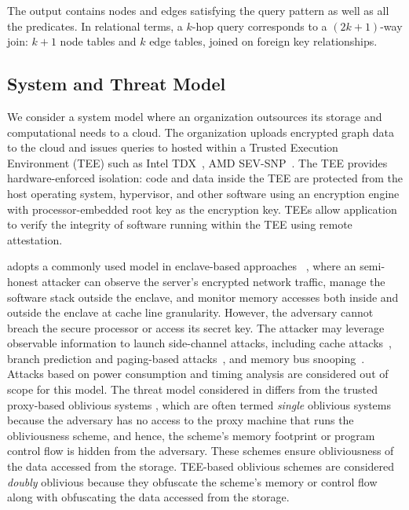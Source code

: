 The output contains nodes and edges satisfying the query pattern as well as all the predicates. 
In relational terms, a $k$-hop query corresponds to a $(2k+1)$-way join: $k+1$ node tables and $k$ edge tables, joined on foreign key relationships. 

\subsection{System and Threat Model}
\label{sec:background:threat}
We consider a system model where an organization outsources its storage and computational needs to a 
cloud. The organization uploads encrypted graph data to the cloud and issues queries to \system hosted
within a Trusted Execution Environment (TEE) such as Intel TDX~\cite{intel_tdx}, AMD SEV-SNP~\cite{sev2020strengthening}. The TEE provides hardware-enforced isolation: code and data 
inside the TEE are protected from the host operating system, hypervisor, and other software
using an encryption engine with processor-embedded root key as the encryption key. 
TEEs allow application to verify the integrity of software running within the TEE using remote 
attestation.


\system adopts a commonly used model in enclave-based approaches
~\cite{dauterman2021snoopy, krastnikov2020efficient, mishra2018oblix, chamani2023graphos, mavrogiannakis2025obliviator}, where an semi-honest attacker can observe the 
server's encrypted network traffic, manage the software stack outside the enclave, and monitor 
memory accesses both inside and outside the enclave at cache line granularity. However, the 
adversary cannot breach the secure processor or access its secret key. 
The attacker  may leverage observable information to launch side-channel attacks, including 
cache attacks~\cite{brasser2017software, hahnel2017high, moghimi2017cachezoom, 
schwarz2017malware}, branch prediction and paging-based attacks~\cite{lee2017inferring, 
van2017telling, xu2015controlled},  and memory bus snooping~\cite{lee2020off}. Attacks based on 
power consumption and timing analysis are considered out of scope for this model.
The threat model considered in \system differs from the trusted proxy-based oblivious systems
\cite{ahmed2025oasisdb,demertzis2020seal,li2014fast,chang2022towards,chang2021efficient},
which are often termed \textit{single} oblivious systems because the adversary has no access
to the proxy machine that runs the obliviousness scheme, and hence, the scheme's memory
footprint or program control flow is hidden from the adversary. These schemes ensure 
obliviousness of the data accessed from the storage. TEE-based oblivious schemes
are considered \textit{doubly} oblivious because they obfuscate the scheme's memory
or control flow along with obfuscating the data accessed from the storage.

